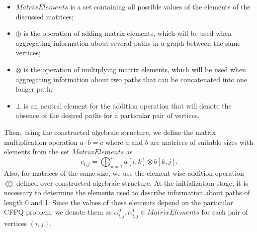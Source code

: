 \begin{itemize}
    \item $\textit{MatrixElements}$ is a set containing all possible values of the elements of the discussed matrices;
    \item $\oplus$ is the operation of adding matrix elements, which will be used when aggregating information about several paths in a graph between the same vertices;
    \item $\otimes$ is the operation of multiplying matrix elements, which will be used when aggregating information about two paths that can be concatenated into one longer path;
    \item $\bot$ is an neutral element for the addition operation that will denote the absence of the desired paths for a particular pair of vertices.
\end{itemize}

Then, using the constructed algebraic structure, we define the matrix multiplication operation \mbox{$a \cdot b = c$} where $a$ and $b$ are matrices of suitable sizes with elements from the set $\textit{MatrixElements}$ as $$c_{i, j} = \bigoplus^{n}_{k=1}{a[i, k] \otimes b[k, j]}.$$ Also, for matrices of the same size, we use the element-wise addition operation $\bigoplus$ defined over constructed algebraic structure. At the initialization stage, it is necessary to determine the elements used to describe information about paths of length 0 and 1. Since the values of these elements depend on the particular CFPQ problem, we denote them as $\alpha^0_{i, j}, \alpha^1_{i, j} \in \textit{MatrixElements}$ for each pair of vertices $(i, j)$.

